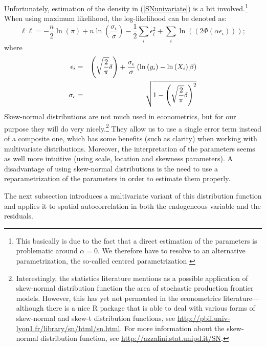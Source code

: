 \documentclass[11pt,parskip,abstracton,notitlepage]{scrartcl}
\begin{document}
Unfortunately, estimation of the density in (\ref{SNunivariate}) is a bit involved.\footnote{This basically is due to the fact that a direct estimation of the parameters is problematic around $\alpha = 0$. We therefore have to resolve to an alternative parametrization, the so-called centred parametrization \citep[see as well][]{ARELLANOVALLE2008}} When using maximum likelihood, the log-likelihood can be denoted as:
%
\begin{equation}
\ell\ell  = - \frac{n}{2}\ln \left(\pi \right) + n \ln \left( \frac{\sigma_\epsilon }{\sigma}\right) - 	\frac{1}{2}\sum_i{\epsilon _i^2} + 
						  \sum_i{ \ln \left((2\Phi(\alpha \epsilon _i))\right)};
\label{eq:}
\end{equation}
%
where 
\begin{eqnarray}
\epsilon _i & =& \left(\sqrt \frac{2}{\pi}\delta\right)+\frac{\sigma_\epsilon }{\sigma} \left(\ln \left(y_i\right)  -\ln \left(X_i\right) \beta \right)\notag \\
\sigma_\epsilon  &=& \sqrt{1-\left(\sqrt \frac{2}{\pi}\delta\right)^2}
\label{eq:centeredparameters}
\end{eqnarray}
%
Skew-normal distributions are not much used in econometrics, but for our purpose they will do very nicely.\footnote{Interestingly, the statistics literature mentions as a possible application of skew-normal distribution function the area of stochastic production frontier models. However, this has yet not permeated in the econometrics literature---although there is a nice R package that is able to deal with various forms of skew-normal and skew-t distribution functions, see \url{http://pbil.univ-lyon1.fr/library/sn/html/sn.html}. For more information about the skew-normal distribution function, see \url{http://azzalini.stat.unipd.it/SN}.} They allow us to use a single error term instead of a composite one, which has some benefits (such as clarity) when working with multivariate distributions. Moreover, the interpretation of the parameters seems as well more intuitive (using scale, location and skewness parameters). A disadvantage of using skew-normal distributions is the need to use a reparametrization of the parameters in order to estimate them properly.

The next subsection introduces a multivariate variant of this distribution function and applies it to spatial autocorrelation in both the endogeneous variable and the residuals.
%
\end{document}
